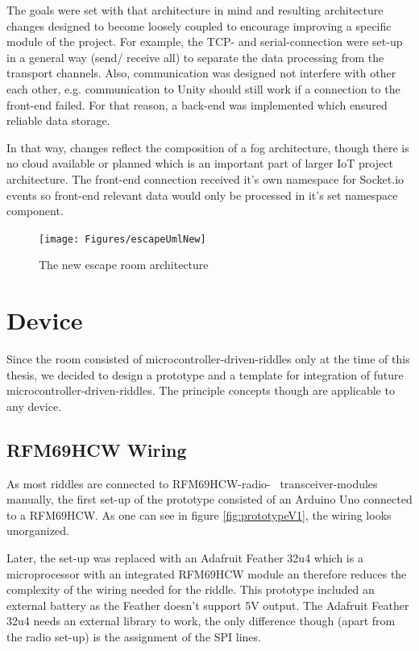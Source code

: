 The goals were set with that architecture in mind and resulting architecture changes
designed to become loosely coupled to encourage improving a specific module of the project.
For example, the TCP- and serial-connection were set-up in a general way (send/ receive all) 
to separate the data processing from the transport channels. 
Also, communication was designed not interfere with other each other, e.g. 
communication to Unity should still work if a connection to the front-end failed.
For that reason, a back-end was implemented which ensured reliable data storage.

In that way, changes reflect the composition of a fog architecture, 
though there is no cloud available or planned which is an important part 
of larger IoT project architecture.
The front-end connection received it's own namespace for Socket.io events so front-end relevant data
would only be processed in it's set namespace component.

\begin{figure}
	\centering
	\texttt{[image: Figures/escapeUmlNew]}
	\caption[New Escape Room Architecture]{The new escape room architecture}
	\label{fig:newEscapeUml}
\end{figure}

\section{Device}
Since the room consisted of microcontroller-driven-riddles only at the time of this thesis, 
we decided to design a prototype and a template for integration of future microcontroller-driven-riddles.
The principle concepts though are applicable to any device.

\subsection{RFM69HCW Wiring}
As most riddles are connected to RFM69HCW-radio- \ transceiver-modules manually, the first set-up of the prototype 
consisted of an Arduino Uno connected to a RFM69HCW. As one can see in figure \ref{fig:prototypeV1},
the wiring looks unorganized.

Later, the set-up was replaced with an Adafruit Feather 32u4 which is a microprocessor with an integrated 
RFM69HCW module an therefore reduces the complexity of the wiring needed for the riddle.
This prototype included an external battery as the Feather doesn't support 5V output.
The Adafruit Feather 32u4 needs an external library to work, the only difference though (apart from the radio set-up)
is the assignment of the SPI lines.

